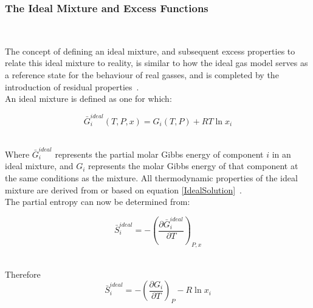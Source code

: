 \subsubsection{The Ideal Mixture and Excess Functions} \label{IdealExcessPropertiesSection}\

The concept of defining an ideal mixture, and subsequent excess properties to relate this ideal mixture to reality, is similar to how the ideal gas model serves as a reference state for the behaviour of real gasses, and is completed by the introduction of residual properties~\cite{MolecularThermodynamicsOfFluidPhaseEquilibria, SmithNessAbbott}.\\

An ideal mixture is defined as one for which:\

\begin{equation}
\bar{G}_{i}^{ideal} \left(T, P, x\right)= G_{i}\left(T, P\right) + RT \ln x_{i} \label{IdealSolution}
\end{equation}\



Where $\bar{G}_{i}^{ideal}$ represents the partial molar Gibbs energy of component $i$ in an ideal mixture, and $G_{i}$ represents the molar Gibbs energy of that component at the same conditions as the mixture. All thermodynamic properties of the ideal mixture are derived from or based on equation \ref{IdealSolution}~\cite{MolecularThermodynamicsOfFluidPhaseEquilibria, SmithNessAbbott}.\\

 The partial entropy can now be determined from:\

\begin{equation}
 \bar{S}_{i}^{ideal}= -\left(\frac{\partial \bar{G}_{i}^{ideal}}{\partial T}\right)_{P,x}
\end{equation}\


Therefore\
\begin{equation}
 \bar{S}_{i}^{ideal}= -\left(\frac{\partial G_{i}}{\partial T}\right)_{P} - R \ln x_{i}
\end{equation}\

